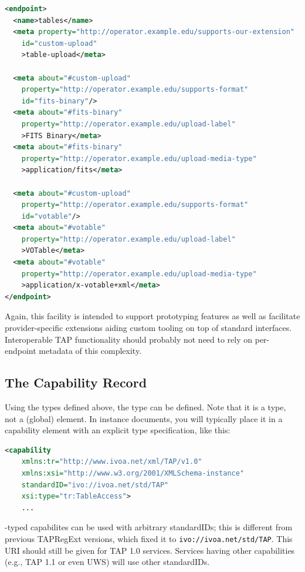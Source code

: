 \documentclass{ivoa}
\begin{document}
\begin{lstlisting}[language=XML, basicstyle=\footnotesize]
<endpoint>
  <name>tables</name>
  <meta property="http://operator.example.edu/supports-our-extension"
    id="custom-upload"
    >table-upload</meta>

  <meta about="#custom-upload"
    property="http://operator.example.edu/supports-format"
    id="fits-binary"/>
  <meta about="#fits-binary"
    property="http://operator.example.edu/upload-label"
    >FITS Binary</meta>
  <meta about="#fits-binary"
    property="http://operator.example.edu/upload-media-type"
    >application/fits</meta>

  <meta about="#custom-upload"
    property="http://operator.example.edu/supports-format"
    id="votable"/>
  <meta about="#votable"
    property="http://operator.example.edu/upload-label"
    >VOTable</meta>
  <meta about="#votable"
    property="http://operator.example.edu/upload-media-type"
    >application/x-votable+xml</meta>
</endpoint>
\end{lstlisting}

Again, this facility is intended to support prototyping features as well
as facilitate provider-specific extensions aiding custom tooling on top
of standard interfaces.  Interoperable TAP functionality should probably
not need to rely on per-endpoint metadata of this complexity.

\subsection{The Capability Record}

\label{caprec}

Using the types defined above, the 
 type can be defined.  Note that
it is a type, not a (global) element.  In instance documents, you
will typically place it in a capability element with an explicit
type specification, like this:


\begin{lstlisting}[language=XML,basicstyle=\footnotesize]
  <capability 
    xmlns:tr="http://www.ivoa.net/xml/TAP/v1.0" 
    xmlns:xsi="http://www.w3.org/2001/XMLSchema-instance" 
    standardID="ivo://ivoa.net/std/TAP" 
    xsi:type="tr:TableAccess">
    ...
\end{lstlisting}

-typed capabilites can be used with arbitrary
standardIDs; this is different from previous TAPRegExt versions, which
fixed it to \nolinkurl{ivo://ivoa.net/std/TAP}.  This URI should still
be given for TAP 1.0 services.  Services having other capabilities
(e.g., TAP 1.1 or even UWS) will use other standardIDs.
\end{document}
